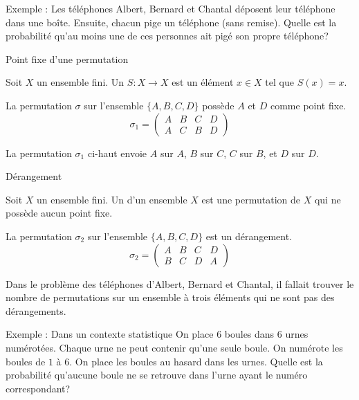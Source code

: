 \documentclass[nuit,charter,pied]{BeamerJS}
\begin{document}
\begin{frame}{Exemple : Les téléphones}
	Albert, Bernard et Chantal déposent leur téléphone dans une boîte. Ensuite, chacun pige un téléphone (sans remise). Quelle est la probabilité qu'au moins une de ces personnes ait pigé son propre téléphone?
\end{frame}

\begin{frame}{Point fixe d'une permutation}
\pause
\begin{defn}
Soit \(X\) un ensemble fini. Un  $S:X\rightarrow X$ est un élément $x\in X$ tel que \(S(x)=x\). 
\end{defn}
\pause
La permutation \(\sigma\) sur l'ensemble \(\{A,B,C,D\}\) possède \(A\) et \(D\) comme point fixe.
\[\sigma_1=
\begin{pmatrix}
    A & B & C & D\\
    A & C & B & D
  \end{pmatrix}
 \]
 \begin{lumiere}
 	La permutation \(\sigma_1\) ci-haut envoie \(A\) sur \(A\), \(B\) sur \(C\), \(C\) sur \(B\), et \(D\) sur \(D\).
 \end{lumiere}
\end{frame}
\begin{frame}{Dérangement}
\begin{defn}{}
Soit \(X\) un ensemble fini. Un  d'un ensemble \(X\) est une permutation de \(X\) qui ne possède aucun point fixe.
\end{defn}
\pause
La permutation \(\sigma_2\) sur l'ensemble \(\{A,B,C,D\}\) est un dérangement.
\[\sigma_2=
\begin{pmatrix}
    A & B & C & D\\
    B & C & D & A
  \end{pmatrix}
 \]
 \pause
 \begin{rem}
 	Dans le problème des téléphones d'Albert, Bernard et Chantal, il fallait trouver le nombre de permutations sur un ensemble à trois éléments qui ne sont pas des dérangements.
 \end{rem}
\end{frame}
\begin{frame}{Exemple : Dans un contexte statistique}
	On place $6$ boules dans $6$ urnes numérotées. Chaque urne ne peut contenir qu'une seule boule. On numérote les boules de $1$ à $6$. On place les boules au hasard dans les urnes. Quelle est la probabilité qu'aucune boule ne se retrouve dans l'urne ayant le numéro correspondant?
\end{frame}
\end{document}
